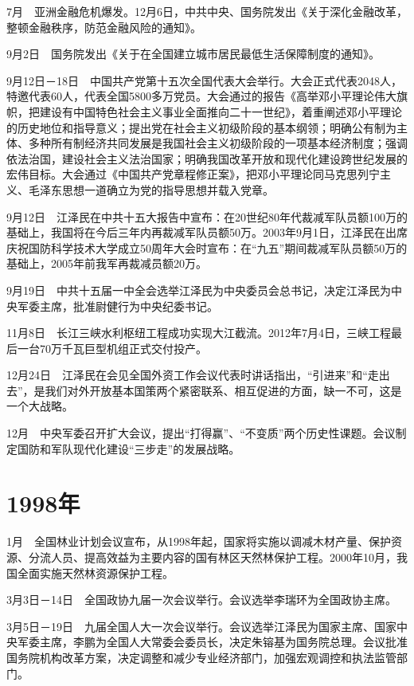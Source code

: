 \documentclass[10pt,a4paper,twocolumn]{book}
\begin{document}
7月　亚洲金融危机爆发。12月6日，中共中央、国务院发出《关于深化金融改革，整顿金融秩序，防范金融风险的通知》。

9月2日　国务院发出《关于在全国建立城市居民最低生活保障制度的通知》。

9月12日－18日　中国共产党第十五次全国代表大会举行。大会正式代表2048人，特邀代表60人，代表全国5800多万党员。大会通过的报告《高举邓小平理论伟大旗帜，把建设有中国特色社会主义事业全面推向二十一世纪》，着重阐述邓小平理论的历史地位和指导意义；提出党在社会主义初级阶段的基本纲领；明确公有制为主体、多种所有制经济共同发展是我国社会主义初级阶段的一项基本经济制度；强调依法治国，建设社会主义法治国家；明确我国改革开放和现代化建设跨世纪发展的宏伟目标。大会通过《中国共产党章程修正案》，把邓小平理论同马克思列宁主义、毛泽东思想一道确立为党的指导思想并载入党章。

9月12日　江泽民在中共十五大报告中宣布：在20世纪80年代裁减军队员额100万的基础上，我国将在今后三年内再裁减军队员额50万。2003年9月1日，江泽民在出席庆祝国防科学技术大学成立50周年大会时宣布：在“九五”期间裁减军队员额50万的基础上，2005年前我军再裁减员额20万。

9月19日　中共十五届一中全会选举江泽民为中央委员会总书记，决定江泽民为中央军委主席，批准尉健行为中央纪委书记。

11月8日　长江三峡水利枢纽工程成功实现大江截流。2012年7月4日，三峡工程最后一台70万千瓦巨型机组正式交付投产。

12月24日　江泽民在会见全国外资工作会议代表时讲话指出，“引进来”和“走出去”，是我们对外开放基本国策两个紧密联系、相互促进的方面，缺一不可，这是一个大战略。

12月　中央军委召开扩大会议，提出“打得赢”、“不变质”两个历史性课题。会议制定国防和军队现代化建设“三步走”的发展战略。

\section{1998年}

1月　全国林业计划会议宣布，从1998年起，国家将实施以调减木材产量、保护资源、分流人员、提高效益为主要内容的国有林区天然林保护工程。2000年10月，我国全面实施天然林资源保护工程。

3月3日－14日　全国政协九届一次会议举行。会议选举李瑞环为全国政协主席。

3月5日－19日　九届全国人大一次会议举行。会议选举江泽民为国家主席、国家中央军委主席，李鹏为全国人大常委会委员长，决定朱镕基为国务院总理。会议批准国务院机构改革方案，决定调整和减少专业经济部门，加强宏观调控和执法监管部门。
\end{document}
